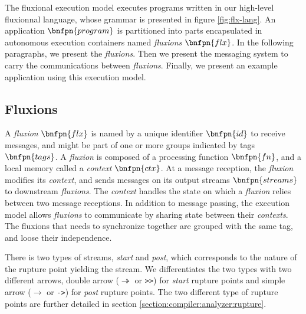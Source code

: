 The fluxional execution model executes programs written in our high-level fluxionnal language, whose grammar is presented in figure \ref{fig:flx-lang}.
An application $\bnfpn{program}$ is partitioned into parts encapsulated in autonomous execution containers named \textit{fluxions} $\bnfpn{flx}$.
In the following paragraphs, we present the \textit{fluxions}.
Then we present the messaging system to carry the communications between \textit{fluxions}.
Finally, we present an example application using this execution model.

\subsection{Fluxions}

A \textit{fluxion} $\bnfpn{flx}$ is named by a unique identifier $\bnfpn{id}$ to receive messages, and might be part of one or more groups indicated by tags $\bnfpn{tags}$.
A \textit{fluxion} is composed of a processing function $\bnfpn{fn}$, and a local memory called a \textit{context} $\bnfpn{ctx}$.
At a message reception, the \textit{fluxion} modifies its \textit{context}, and sends messages on its output streams $\bnfpn{streams}$ to downstream \textit{fluxions}.
The \textit{context} handles the state on which a \textit{fluxion} relies between two message receptions.
In addition to message passing, the execution model allows \textit{fluxions} to communicate by sharing state between their \textit{contexts}.
The fluxions that needs to synchronize together are grouped with the same tag, and loose their independence.

There is two types of streams, \textit{start} and \textit{post}, which corresponds to the nature of the rupture point yielding the stream.
We differentiates the two types with two different arrows, double arrow ($\twoheadrightarrow$ or \texttt{>>}) for \textit{start} rupture points and simple arrow ($\to$ or \texttt{->}) for \textit{post} rupture points.
The two different type of rupture points are further detailed in section \ref{section:compiler:analyzer:rupture}.


